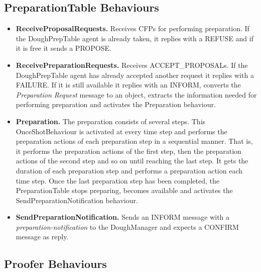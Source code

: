 \documentclass[paper=a4, fontsize=11pt]{scrartcl}
\begin{document}
		\subsection*{PreparationTable Behaviours}
		
		\begin{itemize}
			\item \textbf{ReceiveProposalRequests.} Receives CFPs for performing preparation. If the DoughPrepTable agent is already taken, it replies with a REFUSE and if it is free it sends a PROPOSE.
			
			\item \textbf{ReceivePreparationRequests.} Receives ACCEPT\_PROPOSALs.  If the DoughPrepTable agent has already accepted another request it replies with a FAILURE. If it is still available it replies with an INFORM, converts the \textit{Preparation Request} message to an object, extracts the information needed for performing preparation and activates the Preparation behaviour. 
			
			\item \textbf{Preparation.} The preparation consists of several steps. This OnceShotBehaviour is activated at every time step and performs the preparation actions of each preparation step in a sequential manner. That is, it performs the preparation actions of the first step, then the preparation actions of the second step and so on until reaching the last step. It gets the duration of each preparation step and performs a preparation action each time step. Once the last preparation step has been completed, the PreparationTable stops preparing, becomes available and activates the SendPreparationNotification behaviour.  
			
			\item \textbf{SendPreparationNotification.} Sends an INFORM message with a \textit{preparation-notification} to the DoughManager and expects a CONFIRM message as reply. 
		\end{itemize}
		
		\subsection*{Proofer Behaviours}
		
\end{document}
